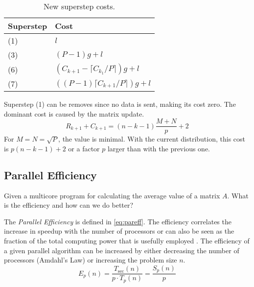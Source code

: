 \documentclass[../main.tex]{subfiles}
\begin{document}
\begin{solution}
\begin{enumerate}
\begin{table}[H]
\begin{tabular}{ll}
		\toprule
		Superstep & Cost  \\
		\midrule
		(1) & $l$ \\
		(3) & $(P-1)g+l$ \\
		(6) & $(C_{k+1} - \lceil C_{k_1}/P  \rceil )g + l$ \\
		(7) & $((P-1) \lceil C_{k+1}/P \rceil )g + l$\\
		\bottomrule
	\end{tabular}
	\caption{New superstep costs.}
	\label{tbl:lucost}
	\end{table}
	Superstep (1) can be removes since no data is sent, making its cost zero. The dominant cost is caused by the matrix update.
	\begin{equation}
		R_{k+1} + C_{k+1} = (n-k-1) \frac{M+N}{p} + 2
	\end{equation}
	For $M = N = \sqrt{P}$, the value is minimal. With the current distribution, this cost is $p (n-k-1) + 2$ or a factor $p$ larger than with the previous one.
\end{enumerate}
\end{solution}

\subsection{Parallel Efficiency}
\begin{question}
Given a multicore program for calculating the average value of a matrix $A$. What is the efficiency and how can we do
better?
\end{question}
\begin{solution} The \emph{Parallel Efficiency} is defined in \autoref{eq:pareff}.
	The efficiency correlates the increase in speedup with the number of processors or can also be seen as the fraction of the total computing power that is usefully employed \cite[p.~141]{bisseling04}.
	The efficiency of a given parallel algorithm can be increased by either decreasing the number of processors (Amdahl's Law) or increasing the problem size $n$.
\begin{equation}\label{eq:pareff}
	E_p(n) = \frac{T_\text{sec}(n)}{p \cdot T_p(n)} = \frac{S_p(n)}{p}
\end{equation}
\end{solution}
\end{document}
